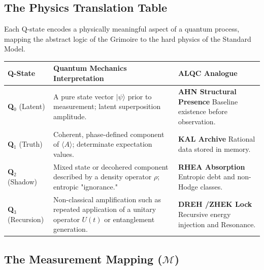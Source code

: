 \documentclass[11pt, letterpaper]{article}
\newcommand{\KAL}{\ensuremath{\mathop{\textnormal{\symbolafont\symbol{"29C9}}}}}    %
\newcommand{\AHN}{\ensuremath{\mathop{\textnormal{\symbolafont\symbol{"27C1}}}}}    %
\newcommand{\DREH}{\ensuremath{\mathop{\textnormal{\symbolafont\symbol{"29D7}}}}}   %
\newcommand{\RHEA}{\ensuremath{\mathop{\textnormal{\symbolafont\symbol{"2A54}}}}}   %
\newcommand{\ZHEK}{\ensuremath{\mathop{\textnormal{\symbolafont\symbol{"25C8}}}}}   %
\def\KAL{KAL}%
\def\AHN{AHN}%
\def\DREH{DREH}%
\def\RHEA{RHEA}%
\def\ZHEK{ZHEK}%
\begin{document}
\subsection{The Physics Translation Table}\label{appendixK.3}

Each Q-state encodes a physically meaningful aspect of a quantum process, mapping the abstract logic of the Grimoire to the hard physics of the Standard Model.

\begin{center}
\begin{longtable}{p{2.5cm} p{5.5cm} p{5.5cm}}
\toprule
\textbf{Q-State} & \textbf{Quantum Mechanics Interpretation} & \textbf{ALQC Analogue} \\
\midrule
\endhead

\textbf{Q$_0$} \newline (Latent) & A pure state vector $|\psi\rangle$ prior to measurement; latent superposition amplitude. & \textbf{\AHN{} Structural Presence} \newline Baseline existence before observation. \\
\addlinespace[1ex]

\textbf{Q$_1$} \newline (Truth) & Coherent, phase-defined component of $\langle A \rangle$; determinate expectation values. & \textbf{\KAL{} Archive} \newline Rational data stored in memory. \\
\addlinespace[1ex]

\textbf{Q$_2$} \newline (Shadow) & Mixed state or decohered component described by a density operator $\rho$; entropic "ignorance." & \textbf{\RHEA{} Absorption} \newline Entropic debt and non-Hodge classes. \\
\addlinespace[1ex]

\textbf{Q$_3$} \newline (Recursion) & Non-classical amplification such as repeated application of a unitary operator $U(t)$ or entanglement generation. & \textbf{\DREH{} \slash  \ZHEK{} Lock} \newline Recursive energy injection and Resonance. \\

\bottomrule
\end{longtable}
\end{center}

\subsection{The Measurement Mapping ($\mathcal{M}$)}\label{appendixK.4}
\end{document}
